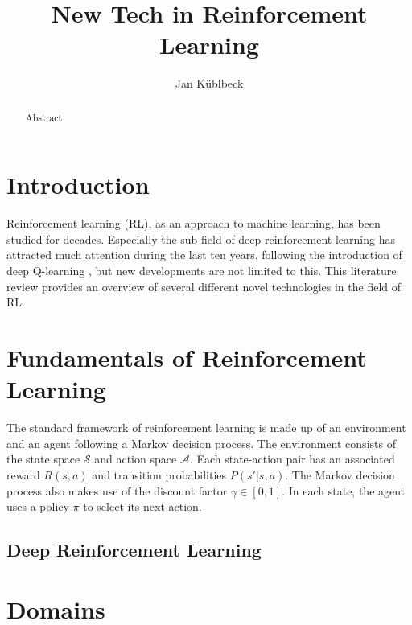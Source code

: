 \documentclass[runningheads]{llncs}
\begin{document}
%
\title{New Tech in Reinforcement Learning}
%
%
\author{Jan Küblbeck}
%
%
%
\maketitle              %
%
\begin{abstract}
Abstract
\end{abstract}
%
%
%
\section{Introduction}

Reinforcement learning (RL), as an approach to machine learning, has been studied for decades. Especially the sub-field of deep reinforcement learning has attracted much attention during the last ten years, following the introduction of deep Q-learning \cite{mnih2013playing}, but new developments are not limited to this. This literature review provides an overview of several different novel technologies in the field of RL.

\section{Fundamentals of Reinforcement Learning}

The standard framework of reinforcement learning is made up of an environment and an agent following a Markov decision process. The environment consists of the state space $\mathcal{S}$ and action space $\mathcal{A}$. Each state-action pair has an associated reward $R(s,a)$ and transition probabilities $P(s'|s,a)$. The Markov decision process also makes use of the discount factor $\gamma \in [0,1]$. In each state, the agent uses a policy $\pi$ to select its next action. \cite{sutton2018reinforcement}

\subsection{Deep Reinforcement Learning}

\section{Domains}
\end{document}
